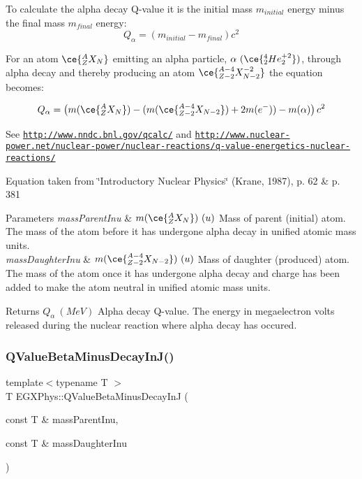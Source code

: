 To calculate the alpha decay Q-\/value it is the initial mass $m_{initial}$ energy minus the final mass $m_{final}$ energy\+: \[Q_{\alpha} = \left ( m_{initial}-m_{final}\right ) c^2\]

For an atom $\ce{ ^{A}_{Z}X_{N} }$ emitting an alpha particle, $\alpha\ (\ce{ ^{4}_{2}He^{+2}_{2} })$, through alpha decay and thereby producing an atom $\ce{ ^{A-4}_{Z{-2}}X^{-2}_{N-2} }$ the equation becomes\+:

\[Q_{\alpha} = \left ( m(\ce{ ^{A}_{Z}X_{N} }) - (m(\ce{ ^{A-4}_{Z{-2}}X_{N-2} }) + 2m(e^-)) - m(\alpha)\right ) c^2\]

See \href{http://www.nndc.bnl.gov/qcalc/}{\tt http\+://www.\+nndc.\+bnl.\+gov/qcalc/} and \href{http://www.nuclear-power.net/nuclear-power/nuclear-reactions/q-value-energetics-nuclear-reactions/}{\tt http\+://www.\+nuclear-\/power.\+net/nuclear-\/power/nuclear-\/reactions/q-\/value-\/energetics-\/nuclear-\/reactions/}

Equation taken from \char`\"{}\+Introductory Nuclear Physics\char`\"{} (Krane, 1987), p. 62 \& p. 381


\begin{DoxyParams}{Parameters}
{\em mass\+Parent\+Inu} & $m(\ce{ ^{A}_{Z}X_{N} })\ (u)$ Mass of parent (initial) atom. The mass of the atom before it has undergone alpha decay in unified atomic mass units. \\
\hline
{\em mass\+Daughter\+Inu} & $m(\ce{ ^{A-4}_{Z{-2}}X_{N-2} })\ (u)$ Mass of daughter (produced) atom. The mass of the atom once it has undergone alpha decay and charge has been added to make the atom neutral in unified atomic mass units. \\
\hline
\end{DoxyParams}
\begin{DoxyReturn}{Returns}
$Q_{\alpha}\ (MeV)$ Alpha decay Q-\/value. The energy in megaelectron volts released during the nuclear reaction where alpha decay has occured. 
\end{DoxyReturn}
\mbox{\label{group___e_g_x_phys-_q_value_ga4a2ab24ffb317abc97ce46c92bb64c3c}} 
\subsubsection{\texorpdfstring{Q\+Value\+Beta\+Minus\+Decay\+In\+J()}{QValueBetaMinusDecayInJ()}}
{\footnotesize\ttfamily template$<$typename T $>$ \\
T E\+G\+X\+Phys\+::\+Q\+Value\+Beta\+Minus\+Decay\+InJ (\begin{DoxyParamCaption}\item[{const T \&}]{mass\+Parent\+Inu,  }\item[{const T \&}]{mass\+Daughter\+Inu }\end{DoxyParamCaption})}



